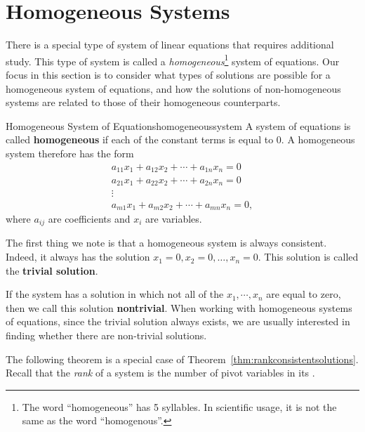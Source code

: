 \section{Homogeneous Systems}

There is a special type of system of linear equations that requires
additional study. This type of system is called a {\em
  homogeneous}\footnote{The word ``homogeneous'' has 5 syllables. In
  scientific usage, it is not the same as the word ``homogenous''.}
system of equations.  Our focus in this section is to consider what
types of solutions are possible for a homogeneous system of equations,
and how the solutions of non-homogeneous systems are related to those
of their homogeneous counterparts.

\begin{definition}{Homogeneous System of Equations}{homogeneoussystem}
  A system of equations is called
  \textbf{homogeneous}
  if each of the constant terms is equal to $0$. A homogeneous system
  therefore has the form
\begin{equation*}
\begin{array}{c}
a_{11}x_{1}+a_{12}x_{2}+\cdots +a_{1n}x_{n}= 0 \\
a_{21}x_{1}+a_{22}x_{2}+\cdots +a_{2n}x_{n}= 0  \\
\vdots \\
a_{m1}x_{1}+a_{m2}x_{2}+\cdots +a_{mn}x_{n}= 0, 
\end{array}
\end{equation*}
where $a_{ij}$ are coefficients and $x_{i}$ are variables.
\end{definition}

The first thing we note is that a homogeneous system is always
consistent. Indeed, it always has the solution $x_1=0, x_2=0, \ldots,
x_n=0$. This solution is called the
\textbf{trivial solution}.

If the system has a solution in which not all of the
$x_1, \cdots, x_n$ are equal to zero, then we call this solution
\textbf{nontrivial}.  When working with homogeneous
systems of equations, since the trivial solution always exists, we are
usually interested in finding whether there are non-trivial solutions.

The following theorem is a special case of
Theorem~\ref{thm:rankconsistentsolutions}. Recall that the
{\em rank}
of a system is the number of pivot variables in its {\ef}.

